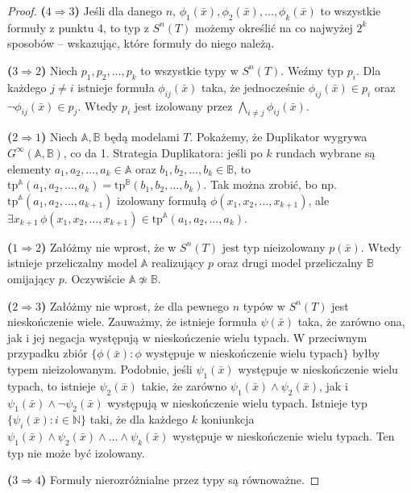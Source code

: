\documentclass{article}
\newcommand{\N}{\mathbb{N}}
\newcommand{\A}{\mathbb{A}}
\newcommand{\B}{\mathbb{B}}
\theoremstyle{plain}
\theoremstyle{definition}
\theoremstyle{remark}
\begin{document}
\begin{proof}
	\textbf{($4 \Rightarrow 3$)} Jeśli dla danego $n$, $\phi_1(\bar{x}), \phi_2(\bar{x}), \ldots, \phi_k(\bar{x})$  to wszystkie formuły z punktu 4, to typ z $S^n(T)$ możemy określić na co najwyżej $2^k$ sposobów -- wskazując, które formuły do niego należą.

	\textbf{($3 \Rightarrow 2$)} Niech $p_1, p_2, \ldots, p_k$ to wszystkie typy w $S^n(T)$.
	Weźmy typ $p_i$.
	Dla każdego $j \neq i$ istnieje formuła $\phi_{ij}(\bar{x})$ taka, że jednocześnie $\phi_{ij}(\bar{x}) \in p_i$ oraz $\neg \phi_{ij}(\bar{x}) \in p_j$.
	Wtedy $p_i$ jest izolowany przez $\bigwedge_{i \neq j} \phi_{ij}(\bar{x})$.

	\textbf{($2 \Rightarrow 1$)} Niech $\A, \B$ będą modelami $T$.
	Pokażemy, że Duplikator wygrywa $G^{\infty}(\A, \B)$, co da 1.
	Strategia Duplikatora:
	jeśli po $k$ rundach wybrane są elementy $a_1, a_2, \ldots, a_k \in \A$ oraz $b_1, b_2, \ldots, b_k \in \B$, to $\text{tp}^{\A}(a_1, a_2, \ldots, a_k) = \text{tp}^{\B}(b_1, b_2, \ldots, b_k)$.
	Tak można zrobić, bo np. $\text{tp}^{\A}(a_1, a_2, \ldots, a_{k+1})$ izolowany formułą
	$\phi(x_1, x_2, \ldots, x_{k+1})$, ale $\exists x_{k+1} \, \phi(x_1, x_2, \ldots, x_{k+1}) \in \text{tp}^{\A}(a_1, a_2, \ldots, a_k)$.

	\textbf{($1 \Rightarrow 2$)} Załóżmy nie wprost, że w $S^n(T)$ jest typ nieizolowany $p(\bar{x})$.
	Wtedy istnieje przeliczalny model $\A$ realizujący $p$ oraz drugi model przeliczalny $\B$ omijający $p$.
	Oczywiście $\A \not \simeq \B$.

	\textbf{($2 \Rightarrow 3$)}
	Załóżmy nie wprost, że dla pewnego $n$ typów w $S^n(T)$ jest nieskończenie wiele.
	Zauważmy, że istnieje formuła $\psi(\bar{x})$ taka, że zarówno ona, jak i jej negacja występują w nieskończenie wielu typach.
	W przeciwnym przypadku zbiór $\{\phi(\bar{x}) \colon \phi \text{ występuje w nieskończenie wielu typach}\}$ byłby typem nieizolowanym.
	Podobnie, jeśli $\psi_1(\bar{x})$ występuje w nieskończenie wielu typach, to istnieje $\psi_2(\bar{x})$ takie, że zarówno $\psi_1(\bar{x})\wedge \psi_2(\bar{x})$, jak i $\psi_1(\bar{x})\wedge \neg \psi_2(\bar{x})$ występują w nieskończenie wielu typach.
	Istnieje typ $\{\psi_i(\bar{x}) \colon i \in \N\}$ taki, że dla każdego $k $ koniunkcja $\psi_1(\bar{x}) \wedge \psi_2(\bar{x}) \wedge \ldots \wedge \psi_k(\bar{x})$ występuje w nieskończenie wielu typach.
	Ten typ nie może być izolowany.

	\textbf{($3 \Rightarrow 4$)}
	Formuły nierozróżnialne przez typy są równoważne.
\end{proof}
\end{document}
